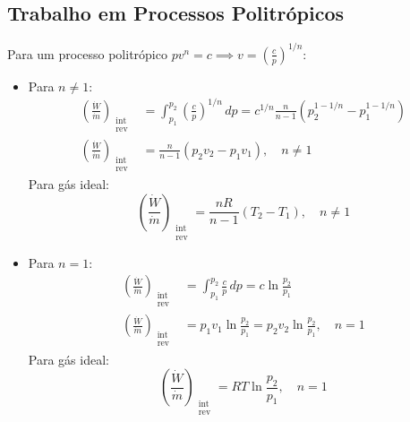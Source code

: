 \subsection{Trabalho em Processos Politrópicos}

Para um processo politrópico $p v^n = c \implies v = \left(\frac{c}{p} \right)^{1/n}$:

\begin{itemize}
    \item Para $n \neq 1$:
    \begin{equation}
        \begin{split}
            \left( \frac{\dot{W}}{\dot{m}} \right)_{\substack{\text{int} \\ \text{rev}}} & = \int_{p_1}^{p_2} \left(\frac{c}{p} \right)^{1/n} \, dp  = c^{1/n} \frac{n}{n-1} \left(p_2^{1-1/n} - p_1^{1-1/n}\right)\\
            \left( \frac{\dot{W}}{\dot{m}} \right)_{\substack{\text{int} \\ \text{rev}}} & = \frac{n}{n-1} \left(p_2 v_2 - p_1 v_1\right), \quad n \neq 1
        \end{split}
    \end{equation}
    Para gás ideal:
    \begin{equation}
        \left( \frac{\dot{W}}{\dot{m}} \right)_{\substack{\text{int} \\ \text{rev}}} = \frac{n R}{n-1} \left(T_2 - T_1\right), \quad n \neq 1
    \end{equation}

    \item Para $n = 1$:
    \begin{equation}
        \begin{split}
            \left( \frac{\dot{W}}{\dot{m}} \right)_{\substack{\text{int} \\ \text{rev}}} & = \int_{p_1}^{p_2} \frac{c}{p} \, dp = c \ln \frac{p_2}{p_1}\\
            \left( \frac{\dot{W}}{\dot{m}} \right)_{\substack{\text{int} \\ \text{rev}}} & = p_1 v_1 \ln \frac{p_2}{p_1} = p_2 v_2 \ln \frac{p_2}{p_1}, \quad n = 1
        \end{split}
    \end{equation}
    Para gás ideal:
    \begin{equation}
        \left( \frac{\dot{W}}{\dot{m}} \right)_{\substack{\text{int} \\ \text{rev}}} = RT \ln \frac{p_2}{p_1}, \quad n = 1
    \end{equation}
\end{itemize}